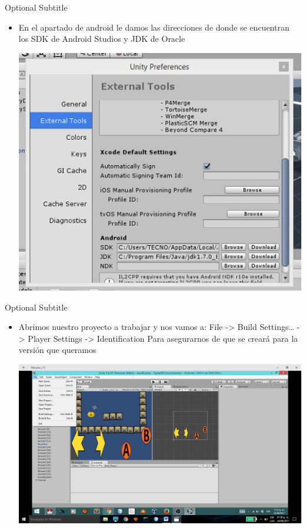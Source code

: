 \documentclass{beamer}
\begin{document}
\begin{frame}{28}{Optional Subtitle}
  \begin{itemize}
  \item {
   En el apartado de android le damos las direcciones de donde se encuentran los SDK de Android Studios y JDK de Oracle
  }
  
  \includegraphics[width=\linewidth, height=0.6\paperheight]{image/IU28}
  \centering
  \end{itemize}
\end{frame}

\begin{frame}{29}{Optional Subtitle}
  \begin{itemize}
  \item {
    Abrimos nuestro proyecto a trabajar y nos vamos a:
File -> Build Settings… -> Player Settings -> Identification
Para asegurarnos de que se creará para la versión que queramos

  }
  \includegraphics[width=\linewidth]{image/IU29}
  \end{itemize}
\end{frame}
\end{document}
